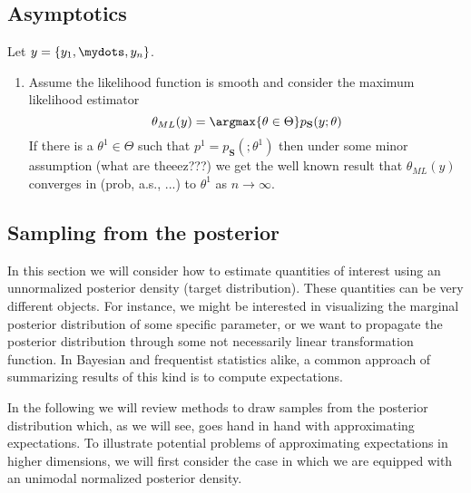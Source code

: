 \subsection{Asymptotics}
Let $y = \{y_1,\mydots,y_n\}$.
\begin{enumerate}
  \item Assume the likelihood function is smooth and consider the maximum likelihood estimator $$\theta_{ML}(y) = \argmax{\theta \in \Theta} p_{\mathbf{S}}(y; \theta)$$
    If there is a $\theta^1 \in \Theta$ such that $p^1 = p_{\mathbf{S}}(;\theta^1)$ then under some minor assumption (what are theeez???) we get the well known result that $\theta_{ML}(y)$ converges in (prob, a.s., ...) to $\theta^1$ as $n \to \infty$.
\end{enumerate}


\subsection{Sampling from the posterior}
In this section we will consider how to estimate quantities of interest using
an unnormalized posterior density (target distribution).
These quantities can be very different objects.
For instance, we might be interested in visualizing the marginal posterior distribution
of some specific parameter, or we want to propagate the posterior distribution
through some not necessarily linear transformation function.
In Bayesian and frequentist statistics alike, a common approach of summarizing
results of this kind is to compute expectations.

In the following we will review methods to draw samples from the posterior
distribution which, as we will see, goes hand in hand with approximating expectations.
To illustrate potential problems of approximating expectations in higher dimensions,
we will first consider the case in which we are equipped with an unimodal normalized posterior density.

